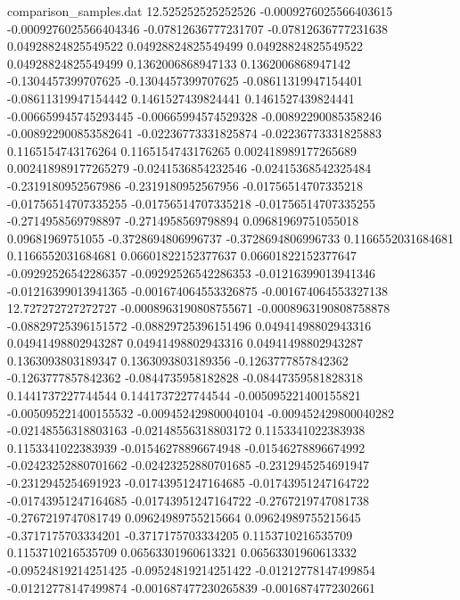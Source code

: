 \begin{filecontents}{comparison_samples.dat}
12.525252525252526  -0.0009276025566403615  -0.0009276025566404346  -0.07812636777231707   -0.07812636777231638   0.04928824825549522    0.04928824825549499    0.04928824825549522    0.04928824825549499    0.1362006868947133     0.1362006868947142     -0.1304457399707625     -0.1304457399707625     -0.08611319947154401   -0.08611319947154442   0.1461527439824441      0.1461527439824441      -0.006659945745293445   -0.00665994574529328    -0.00892290085358246    -0.008922900853582641   -0.02236773331825874    -0.02236773331825883    0.1165154743176264      0.1165154743176265      0.002418989177265689    0.002418989177265279    -0.0241536854232546    -0.02415368542325484   -0.2319180952567986    -0.2319180952567956    -0.01756514707335218    -0.01756514707335255    -0.01756514707335218    -0.01756514707335255    -0.2714958569798897    -0.2714958569798894    0.09681969751055018     0.09681969751055        -0.3728694806996737    -0.3728694806996733    0.1166552031684681      0.1166552031684681      0.06601822152377637     0.06601822152377647     -0.09292526542286357   -0.09292526542286353   -0.01216399013941346   -0.01216399013941365   -0.001674064553326875   -0.001674064553327138 
12.727272727272727  -0.0008963190808755671  -0.0008963190808758878  -0.08829725396151572   -0.08829725396151496   0.04941498802943316    0.04941498802943287    0.04941498802943316    0.04941498802943287    0.1363093803189347     0.1363093803189356     -0.1263777857842362     -0.1263777857842362     -0.0844735958182828    -0.08447359581828318   0.1441737227744544      0.1441737227744544      -0.005095221400155821   -0.005095221400155532   -0.009452429800040104   -0.009452429800040282   -0.02148556318803163    -0.02148556318803172    0.1153341022383938      0.1153341022383939      -0.01546278896674948    -0.01546278896674992    -0.02423252880701662   -0.02423252880701685   -0.2312945254691947    -0.2312945254691923    -0.01743951247164685    -0.01743951247164722    -0.01743951247164685    -0.01743951247164722    -0.2767219747081738    -0.2767219747081749    0.09624989755215664     0.09624989755215645     -0.3717175703334201    -0.3717175703334205    0.1153710216535709      0.1153710216535709      0.06563301960613321     0.06563301960613332     -0.09524819214251425   -0.09524819214251422   -0.01212778147499854   -0.01212778147499874   -0.001687477230265839   -0.0016874772302661   

\end{filecontents}
